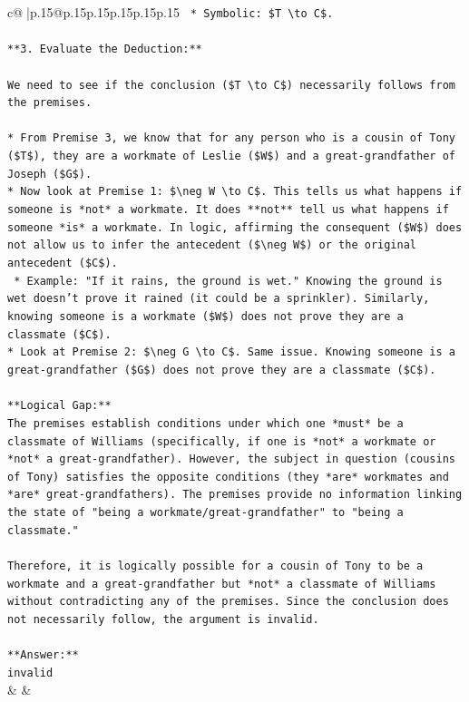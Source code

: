 \documentclass{article}
\begin{document}
{\begin{supertabular}{c@{$\;$}|p{.15\linewidth}@{}p{.15\linewidth}p{.15\linewidth}p{.15\linewidth}p{.15\linewidth}p{.15\linewidth}}
{{{\texttt{    *   Symbolic: \$T \textbackslash{}to C\$.} \\
\\ 
\texttt{**3. Evaluate the Deduction:**} \\
\\ 
\texttt{We need to see if the conclusion (\$T \textbackslash{}to C\$) necessarily follows from the premises.} \\
\\ 
\texttt{*   From Premise 3, we know that for any person who is a cousin of Tony (\$T\$), they are a workmate of Leslie (\$W\$) and a great{-}grandfather of Joseph (\$G\$).} \\
\texttt{*   Now look at Premise 1: \$\textbackslash{}neg W \textbackslash{}to C\$. This tells us what happens if someone is *not* a workmate. It does **not** tell us what happens if someone *is* a workmate. In logic, affirming the consequent (\$W\$) does not allow us to infer the antecedent (\$\textbackslash{}neg W\$) or the original antecedent (\$C\$).} \\
\texttt{    *   Example: "If it rains, the ground is wet." Knowing the ground is wet doesn't prove it rained (it could be a sprinkler). Similarly, knowing someone is a workmate (\$W\$) does not prove they are a classmate (\$C\$).} \\
\texttt{*   Look at Premise 2: \$\textbackslash{}neg G \textbackslash{}to C\$. Same issue. Knowing someone is a great{-}grandfather (\$G\$) does not prove they are a classmate (\$C\$).} \\
\\ 
\texttt{**Logical Gap:**} \\
\texttt{The premises establish conditions under which one *must* be a classmate of Williams (specifically, if one is *not* a workmate or *not* a great{-}grandfather). However, the subject in question (cousins of Tony) satisfies the opposite conditions (they *are* workmates and *are* great{-}grandfathers). The premises provide no information linking the state of "being a workmate/great{-}grandfather" to "being a classmate."} \\
\\ 
\texttt{Therefore, it is logically possible for a cousin of Tony to be a workmate and a great{-}grandfather but *not* a classmate of Williams without contradicting any of the premises. Since the conclusion does not necessarily follow, the argument is invalid.} \\
\\ 
\texttt{**Answer:**} \\
\texttt{invalid} \\
            }
        }
    }
    & & \\ \\


\end{supertabular}}
\end{document}
